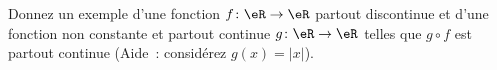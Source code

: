 
\begin{exercice}\label{exo0039}

Donnez un exemple d'une fonction $f\colon \eR\to \eR$ partout discontinue et d'une fonction non constante et partout continue $g\colon \eR\to \eR$ telles que $g\circ f$ est partout continue (Aide~: considérez $g(x)=|x|$).

\end{exercice}
